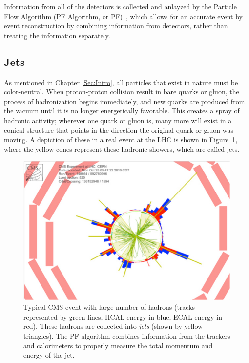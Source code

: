 Information from all of the detectors is collected and anlayzed by the Particle Flow Algorithm (PF Algorithm, or PF)~\cite{CMS-PAS-PFT-09-001}, which allows for an accurate event by event reconstruction by combining information from detectors, rather than treating the information separately.
\vspace{5mm} 

\subsection{Jets}

As mentioned in Chapter \ref{Sec:Intro}, all particles that exist in nature must be color-neutral. When proton-proton collision result in bare quarks or gluon, the process of hadronization begins immediately, and new quarks are produced from the vacuum until it is no longer energetically favorable. This creates a spray of hadronic activity; wherever one quark or gluon is, many more will exist in a conical structure that points in the direction the original quark or gluon was moving. A depiction of these in a real event at the LHC is shown in Figure~\ref{Fig:CMS:Jet}, where the yellow cones represent these hadronic showers, which are called jets.
\begin{figure}[h!]
    \centering
        \includegraphics[width=\textwidth]{F3/Jets}
        \caption{Typical CMS event with large number of hadrons (tracks represented by green lines, HCAL energy in blue, ECAL energy in red). These hadrons are collected into \textit{jets} (shown by yellow triangles). The PF algorithm combines information from the trackers and calorimeters to properly measure the total momentum and energy of the jet.}
        \label{Fig:CMS:Jet}
\end{figure}
